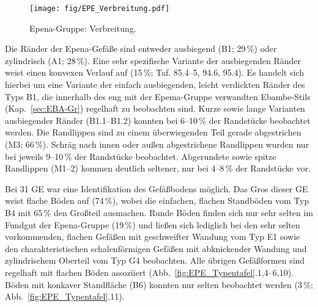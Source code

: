 \begin{figure}[p]
	\centering
	\texttt{[image: fig/EPE\_Verbreitung.pdf]}
	\caption{Epena-Gruppe: Verbreitung.}
	\label{fig:EPE_Verbreitung}
\end{figure}

Die Ränder der Epena-Gefäße sind entweder ausbiegend (B1; 29\,\%) oder zylindrisch (A1; 28\,\%). Eine sehr spezifische Variante der ausbiegenden Ränder weist einen konvexen Verlauf auf (15\,\%; Taf. 85.4--5, 94.6, 95.4). Es handelt sich hierbei um eine Variante der einfach ausbiegenden, leicht verdickten Ränder des Typs B1, die innerhalb des eng mit der Epema-Gruppe verwandten Ebambe-Stils (Kap.~\ref{sec:EBA-Gr}) regelhaft zu beobachten sind. Kurze sowie lange Varianten ausbiegender Ränder (B1.1--B1.2) konnten bei 6--10\,\% der Randstücke beobachtet werden. Die Randlippen sind zu einem überwiegenden Teil gerade abgestrichen (M3; 66\,\%). Schräg nach innen oder außen abgestrichene Randlippen wurden nur bei jeweils 9--10\,\% der Randstücke beobachtet. Abgerundete sowie spitze Randlippen (M1--2) kommen deutlich seltener, nur bei 4--8\,\% der Randstücke vor.

Bei 31 GE war eine Identifikation des Gefäßbodens möglich. Das Gros dieser GE weist flache Böden auf (74\,\%), wobei die einfachen, flachen Standböden vom Typ B4 mit 65\,\% den Großteil ausmachen. Runde Böden finden sich nur sehr selten im Fundgut der Epena-Gruppe (19\,\%) und ließen sich lediglich bei den sehr selten vorkommenden, flachen Gefäßen mit geschweifter Wandung vom Typ E1 sowie den charakteristischen schalenförmigen Gefäßen mit abknickender Wandung und zylindrischem Oberteil vom Typ G4 beobachten. Alle übrigen Gefäßformen sind regelhaft mit flachen Böden assoziiert (Abb.~\ref{fig:EPE_Typentafel}.1,4--6,10). Böden mit konkaver Standfläche (B6) konnten nur selten beobachtet werden (3\,\%; Abb.~\ref{fig:EPE_Typentafel}.11).

